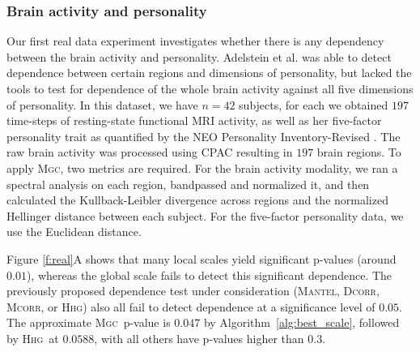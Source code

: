 \documentclass[11pt]{article}
\providecommand{\sct}[1]{{\normalfont\textsc{#1}}}
\newcommand{\Mgc}{\sct{Mgc}}
\newcommand{\Hhg}{\sct{Hhg}}
\newcommand{\Dcorr}{\sct{Dcorr}}
\newcommand{\Mcorr}{\sct{Mcorr}}
\newcommand{\Mantel}{\sct{Mantel}}
\begin{document}
\subsubsection*{Brain activity and personality} %
Our first real data experiment investigates whether there is any dependency between the brain activity and personality.
Adelstein et al. \cite{AdelsteinEtAl2011} was able to detect dependence between certain regions and dimensions of personality, but lacked the tools to test for dependence of the whole brain activity against all five dimensions of personality. 
In this dataset, we have $n=42$ subjects, for each we obtained  $197$ time-steps of resting-state functional MRI activity, as well as her five-factor personality trait as quantified by  the NEO Personality Inventory-Revised  \cite{Costa1992}. 
The raw brain activity was processed using CPAC \cite{CPAC2015} resulting in $197$ brain regions.
To apply \Mgc, two metrics are required. For the brain activity modality, we ran a spectral analysis on each region, bandpassed and normalized it, and then calculated the Kullback-Leibler divergence across regions and the normalized Hellinger distance between each subject. 
For the five-factor personality data, we  use the Euclidean distance.




Figure \ref{f:real}A  shows that many local scales yield significant p-values (around $0.01$), whereas the global scale fails to detect this significant dependence. The previously proposed dependence test under consideration (\Mantel, \Dcorr, \Mcorr, or \Hhg) also all fail to detect dependence at a significance level of $0.05$. The approximate \Mgc~p-value is $0.047$ by Algorithm~\ref{alg:best_scale}, followed by \Hhg~at $0.0588$, with all others have p-values higher than $0.3$.
\end{document}
